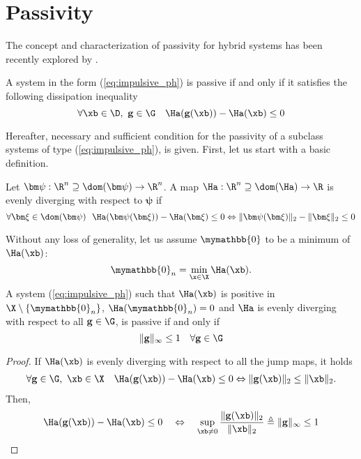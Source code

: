 \section{Passivity}
%
The concept and characterization of passivity for hybrid systems has been recently explored by \cite{naldi2013passivity}.
%
\begin{defn}\label{def:impulsive_passivity}
    A system in the form (\ref{eq:impulsive_ph}) is passive if and only if it satisfies the following dissipation inequality
    \begin{equation}
        \forall\xb\in\D,~\mathbf{g}\in\G \quad \Ha(\mathbf{g}(\xb))-\Ha(\xb)\leq 0
    \end{equation}
\end{defn}
%
Hereafter, necessary and sufficient condition for the passivity of a subclass systems of type (\ref{eq:impulsive_ph}), is given. First, let us start with a basic definition.
%
\begin{defn}
	Let $\bm\psi:\R^n\supseteq\dom(\bm\psi)\rightarrow\R^n$. A map $\Ha:\R^n\supseteq\dom(\Ha)\rightarrow\R$ is evenly diverging with respect to $\bm\psi$ if
	\begin{equation}
	    \forall\bm\xi\in\dom(\bm\psi)~~\Ha(\bm\psi(\bm\xi))-\Ha(\bm\xi)\leq 0 \Leftrightarrow \|\bm\psi(\bm\xi)\|_2-\|\bm\xi\|_2\leq {0}
	\end{equation}
\end{defn}
%
\begin{prop}\label{prop:pass_impulsive}
	Without any loss of generality, let us assume $\mymathbb{0}$ to be a minimum of $\Ha(\xb)$:
	\begin{equation}
	    \mymathbb{0}_n = \min_{\x\in\X}\Ha(\xb).
	\end{equation}
	A system (\ref{eq:impulsive_ph}) such that $\Ha(\xb)$ is positive in $\X\setminus\{\mymathbb{0}_n\}$, $\Ha(\mymathbb{0}_n)=0$ and $\Ha$ is evenly diverging with respect to all $\mathbf{g}\in\G$, is passive if and only if 
	\begin{equation}\label{eq:nl_pass}
		\|\mathbf{g}\|_\infty\leq 1\quad\forall \mathbf{g}\in\G
	\end{equation}
\end{prop}
%
\begin{proof}
	If $\Ha(\xb)$ is evenly diverging with respect to all the jump maps, it holds
	\begin{align}
	    \forall\mathbf{g}\in\G,~\xb\in\X\quad\Ha(\mathbf{g}(\xb))-\Ha(\xb)\leq 0 \Leftrightarrow \|\mathbf{g}(\xb)\|_2 \leq \|\xb\|_2.
	\end{align}
	Then,
	\begin{align*}
	\Ha(\mathbf{g}(\xb))-\Ha(\xb)\leq 0 \quad \Leftrightarrow \quad \sup\limits_{\xb\neq 0}\frac{\|\mathbf{g}(\xb)\|_2}{\|\xb\|_2} \triangleq \|\mathbf{g}\|_\infty\leq 1
	\end{align*}
\end{proof}
